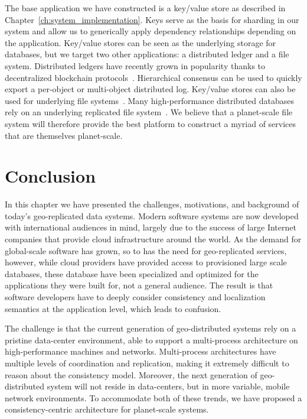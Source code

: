 The base application we have constructed is a key/value store as described in Chapter~\ref{ch:system_implementation}.
Keys serve as the basis for sharding in our system and allow us to generically apply dependency relationships depending on the application.
Key/value stores can be seen as the underlying storage for databases, but we target two other applications: a distributed ledger and a file system.
Distributed ledgers have recently grown in popularity thanks to decentralized blockchain protocols~\cite{fruitchains}.
Hierarchical consensus can be used to quickly export a per-object or multi-object distributed log.
Key/value stores can also be used for underlying file systems~\cite{s3}.
Many high-performance distributed databases rely on an underlying replicated file system~\cite{aurora,btrdb,bigtable,megastore,spanner}.
We believe that a planet-scale file system will therefore provide the best platform to construct a myriad of services that are themselves planet-scale.

\section{Conclusion}

In this chapter we have presented the challenges, motivations, and background of today's geo-replicated data systems.
Modern software systems are now developed with international audiences in mind, largely due to the success of large Internet companies that provide cloud infrastructure around the world.
As the demand for global-scale software has grown, so to has the need for geo-replicated services, however, while cloud providers have provided access to provisioned large scale databases, these database have been specialized and optimized for the applications they were built for, not a general audience.
The result is that software developers have to deeply consider consistency and localization semantics at the application level, which leads to confusion.

The challenge is that the current generation of geo-distributed systems rely on a pristine data-center environment, able to support a multi-process architecture on high-performance machines and networks.
Multi-process architectures have multiple levels of coordination and replication, making it extremely difficult to reason about the consistency model.
Moreover, the next generation of geo-distributed system will not reside in data-centers, but in more variable, mobile network environments.
To accommodate both of these trends, we have proposed a consistency-centric architecture for planet-scale systems.

